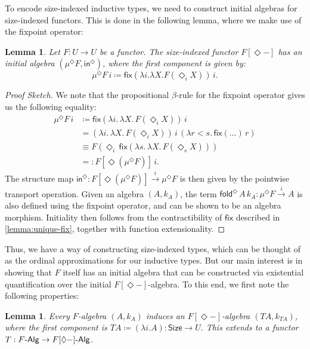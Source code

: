 \documentclass[10pt,a4paper]{article}
\newtheorem{lemma}[theorem]{Lemma}
\theoremstyle{definition}
\theoremstyle{remark}
\renewcommand{\.}{.\,} %
\renewcommand{\:}{:} %
\newcommand{\Size}{\mathsf{Size}}
\newcommand{\fix}{\mathsf{fix}}
\newcommand{\fold}{\mathsf{fold}}
\newcommand{\FAlg}{F\text-\sf{Alg}}
\newcommand{\sFAlg}{F[\Diamond{-}]\text-\sf{Alg}}
\newcommand{\In}{\mathsf{in}}
\newcommand{\sto}{\overset{i}{\to}}
\newcommand{\0}{\mathbf{0}}
\newcommand{\1}{\mathbf{1}}
\newcommand\<\langle
\renewcommand\>\rangle
\renewcommand\sf\mathsf
\theoremstyle{remark}
\begin{document}
To encode size-indexed inductive types, we need to construct initial algebras for size-indexed functors. This is done in the following lemma, where we make use of the fixpoint operator:
\begin{lemma}\label{lemma:inductive-sized-encoding}
    Let \( F : U \to U \) be a functor. The size-indexed functor \( F[\Diamond -] \) has an initial algebra \( (\mu^\Diamond F, \In^\Diamond) \), where the first component is given by:
\[
    \mu^\Diamond F \, i \coloneqq  \fix (\lambda i. \lambda  X. F(\Diamond_i X)) \, i.
\] 
\end{lemma}
\begin{proof}[Proof Sketch]
    We note that the propositional \( \beta \)-rule for the fixpoint operator gives us the following equality:
    \begin{align*}
        \mu^\Diamond F \, i &\coloneqq\fix (\lambda i \. \lambda X\. F(\Diamond_i X)) \, i \\
        &= (\lambda i \. \lambda X\. F(\Diamond_i X)) \, i \, (\lambda r < s \. \fix (\dots) \, r) \\
        &\equiv F(\Diamond_i \, \fix (\lambda s \. \lambda X\. F(\Diamond_s X)) ) \\
        & =: F [\Diamond (\mu^\Diamond F)] \, i
    .\end{align*}
    The structure map \( \In^\Diamond : F[\Diamond (\mu^\Diamond F)] \sto \mu^\Diamond F \) is then given by the pointwise transport operation. Given an algebra \( (A, k_A) \), the term \( \fold^\Diamond \, A \, k_A : \mu^\Diamond F \sto A\) is also defined using the fixpoint operator, and can be shown to be an algebra morphism. Initiality then follows from the contractibility of \( \fix \!\) described in \autoref{lemma:unique-fix}, together with function extensionality.
\end{proof}
Thus, we have a way of constructing size-indexed types, which can be thought of as the ordinal approximations for our inductive types. But our main interest is in showing that $F$ itself has an initial algebra that can be constructed via existential quantification over the initial \( F[\Diamond{-}] \)-algebra.
To this end, we first note the following properties:
\begin{lemma}
    Every \( F \)-algebra \( (A, k_A) \) induces an \( F[\Diamond{-}] \)-algebra \( (TA, k_{TA}) \), where the first component is 
    \(
        TA \coloneqq (\lambda i. A) : \Size \to U.
    \) 
This extends to a functor \( T : \FAlg \to \sFAlg \). 
\end{lemma}
\end{document}
